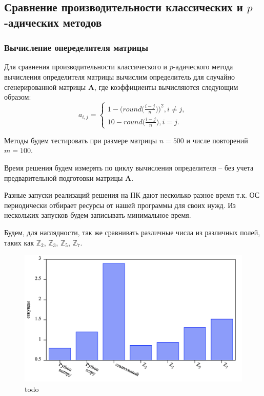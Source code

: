\documentclass[master, och, diploma, times]{sty/SCWorks}
\theoremstyle{plain}
\theoremstyle{definition}
\begin{document}
\subsection{Сравнение производительности классических и $p$-адических \mbox{методов}}

\subsubsection{Вычисление опеределителя матрицы}

Для сравнения производительности классического и $p$-адического метода вычисления определителя матрицы вычислим определитель для случайно сгенерированной матрицы $\boldsymbol{A}$, где коэффициенты вычисляются следующим образом:
$$
a_{i,j}= 
\begin{cases} 
1-\bigg(round\bigg(\frac{i-j}{n}\bigg)\bigg)^2, i \neq j, \\ 
10-round\bigg(\frac{i-j}{n}\bigg), i = j.
\end{cases}
$$

Методы будем тестировать при размере матрицы $n=500$ и числе повторений $m=100$.

Время решения будем измерять по циклу вычисления определителя – без учета предварительной подготовки матрицы $\boldsymbol{A}$.

Разные запуски реализаций решения на ПК дают несколько разное время т.к. ОС периодически отбирает ресурсы от нашей программы для своих нужд. Из нескольких запусков будем записывать минимальное время.

Будем, для наглядности, так же сравнивать различные числа из различных полей, таких как $\mathbb{Z}_2$, $\mathbb{Z}_3$, $\mathbb{Z}_5$, $\mathbb{Z}_7$.

\begin{figure}[H]
\centerline{\includegraphics[width=0.85\linewidth]{../gnuplot/single/det/plot.png}}
\caption{todo}
\label{img:single:det}
\end{figure}
\end{document}
